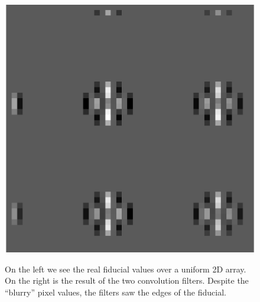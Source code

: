 \documentclass[10pt]{article}
\begin{document}
\begin{figure}[!ht]
{            \includegraphics[width=0.98\linewidth, height = .34\textheight, keepaspectratio=true]{../plots_tables_images/whodunit.eps}
        }    
        \caption{On the left we see the real fiducial values over a uniform 2D array. On the right is the result of the two convolution filters. Despite the ``blurry'' pixel values, the filters saw the edges of the fiducial.}
    \label{whodunit}
\end{figure}
\end{document}
